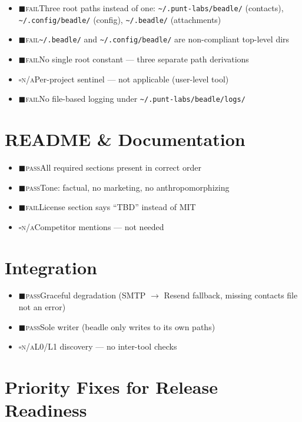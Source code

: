 \documentclass[a4paper,10pt]{article}
\newcommand{\pass}{{\color{green!60!black}$\blacksquare$\hspace{0.4em}\textsc{pass}}\hspace{0.5em}}
\newcommand{\fail}{{\color{red!70!black}$\blacksquare$\hspace{0.4em}\textsc{fail}}\hspace{0.5em}}
\newcommand{\na}{{\color{gray}$\square$\hspace{0.4em}\textsc{n/a}}\hspace{0.5em}}
\begin{document}
\begin{itemize}
  \item \fail Three root paths instead of one:
    \texttt{\textasciitilde/.punt-labs/beadle/} (contacts),
    \texttt{\textasciitilde/.config/beadle/} (config),
    \texttt{\textasciitilde/.beadle/} (attachments)
  \item \fail \texttt{\textasciitilde/.beadle/} and
    \texttt{\textasciitilde/.config/beadle/} are non-compliant top-level dirs
  \item \fail No single root constant --- three separate path derivations
  \item \na Per-project sentinel --- not applicable (user-level tool)
  \item \fail No file-based logging under
    \texttt{\textasciitilde/.punt-labs/beadle/logs/}
\end{itemize}

% 
\section{README \& Documentation}

\begin{itemize}
  \item \pass All required sections present in correct order
  \item \pass Tone: factual, no marketing, no anthropomorphizing
  \item \fail License section says ``TBD'' instead of MIT
  \item \na Competitor mentions --- not needed
\end{itemize}

% 
\section{Integration}

\begin{itemize}
  \item \pass Graceful degradation (SMTP $\to$ Resend fallback, missing
    contacts file not an error)
  \item \pass Sole writer (beadle only writes to its own paths)
  \item \na L0/L1 discovery --- no inter-tool checks
\end{itemize}

% 
\newpage
\section{Priority Fixes for Release Readiness}
\end{document}

